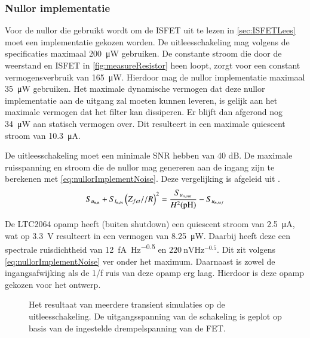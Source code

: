 \subsubsection{Nullor implementatie}
Voor de nullor die gebruikt wordt om de ISFET uit te lezen in \cref{sec:ISFETLees} moet een implementatie gekozen worden. De uitleesschakeling mag volgens de specificaties maximaal \qty{200}{\micro\watt}  gebruiken. De constante stroom die door de weerstand en ISFET in \cref{fig:measureResistor} heen loopt, zorgt voor een constant vermogensverbruik van \qty{165}{\micro\watt}. Hierdoor mag de nullor implementatie maximaal \qty{35}{\micro\watt} gebruiken. Het maximale dynamische vermogen dat deze nullor implementatie aan de uitgang zal moeten kunnen leveren, is gelijk aan het maximale vermogen dat het filter kan dissiperen. Er blijft dan afgerond nog \qty{34}{\micro\watt} aan statisch vermogen over. Dit resulteert in een maximale quiescent stroom van \qty{10.3}{\micro\ampere}.

De uitleesschakeling moet een minimale SNR hebben van 40 dB. De maximale ruisspanning en stroom die de nullor mag genereren aan de ingang zijn te berekenen met \cref{eq:nullorImplementNoise}. Deze vergelijking is afgeleid uit .
\begin{equation} \label{eq:nullorImplementNoise}
    S_{u_{{n,n}}} + S_{i_{{n,in}}}\left(Z_{fet} // R\right)^2 = \frac{S_{u_{{n,out}}}}{H^2(\mathrm{pH})} - S_{u_{{n,ref}}}
\end{equation}

De LTC2064 opamp heeft (buiten shutdown) een quiescent stroom van \qty{2.5}{\micro\ampere}, wat op \qty{3.3}{\volt} resulteert in een vermogen van \qty{8.25}{\micro\watt}. Daarbij heeft deze een spectrale ruisdichtheid van \qty{12}{\femto\ampere\hertz^{-0.5}} en $\qty{220}{\nano\volt\hertz^{-0.5}}$\cite{LTC2064}. Dit zit volgens \cref{eq:nullorImplementNoise} ver onder het maximum. Daarnaast is zowel de ingangsafwijking als de 1/f ruis van deze opamp erg laag. Hierdoor is deze opamp gekozen voor het ontwerp.


\begin{figure}[!htbp]
    \centering
    \pgfplotsset{width=0.7\textwidth}
    
    \caption{Het resultaat van meerdere transient simulaties op de uitleesschakeling. De uitgangsspanning van de schakeling is geplot op basis van de ingestelde drempelspanning van de FET.}
    \label{fig:readoutSimTrans}
\end{figure}